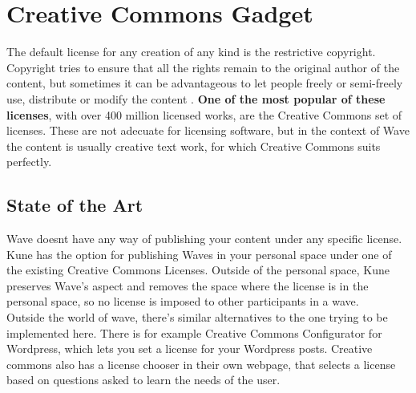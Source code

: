 \thispagestyle{sectioned}
\chapter{Creative Commons Gadget}

The default license for any creation of any kind is the restrictive copyright. Copyright tries to ensure that all the rights remain to the original author of the content, but sometimes it can be advantageous to let people freely or semi-freely use, distribute or modify the content \cite{ref:oss_why}. \textbf{One of the most popular of these licenses}, with over 400 million \cite{ref:the_power_of_open} licensed works, are the Creative Commons set of licenses. These are not adecuate for licensing software, but in the context of Wave the content is usually creative text work, for which Creative Commons suits perfectly.

\label{subsec:cc_soa}
\section{State of the Art}
Wave doesnt have any way of publishing your content under any specific license. Kune has the option for publishing Waves in your personal space under one of the existing Creative Commons Licenses. Outside of the personal space, Kune preserves Wave's aspect and removes the space where the license is in the personal space, so no license is imposed to other participants in a wave.\\[.2cm]
Outside the world of wave, there's similar alternatives to the one trying to be implemented here. There is for example Creative Commons Configurator for Wordpress, which lets you set a license for your Wordpress posts. Creative commons also has a license chooser \cite{ref:cc_chooser} in their own webpage, that selects a license based on questions asked to learn the needs of the user.
